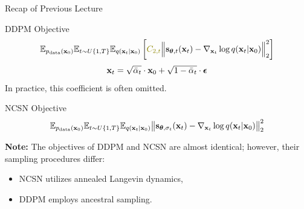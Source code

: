 \documentclass{beamer}
\begin{document}
\begin{frame}{Recap of Previous Lecture}
	\begin{block}{DDPM Objective}
		\vspace{-0.5cm}
		\[
			\bbE_{\pd(\bx_0)} \bbE_{t \sim U\{1, T\}}\bbE_{q(\bx_t | \bx_0)} \left[ {\color{olive}C_{2, t}} \Bigl\|  \bs_{\btheta, t} (\bx_t) - \nabla_{\bx_t} \log q(\bx_t | \bx_0) \Bigr\|_2^2  \right]
		\]
		\[
			\mathbf{x}_t = \sqrt{\bar{\alpha}_t} \cdot \mathbf{x}_0 + \sqrt{1 - \bar{\alpha}_t} \cdot \boldsymbol{\epsilon}
		\]
		In practice, {\color{olive}this coefficient} is often omitted.
	\end{block}
	\begin{block}{NCSN Objective}
		\vspace{-0.3cm}
		\[
			\mathbb{E}_{p_{\text{data}}(\mathbf{x}_0)} \mathbb{E}_{t \sim U\{1, T\}} \mathbb{E}_{q(\mathbf{x}_t | \mathbf{x}_0)}\bigl\| \mathbf{s}_{\boldsymbol{\theta}, \sigma_t}(\mathbf{x}_t) - \nabla_{\mathbf{x}_t} \log q(\mathbf{x}_t | \mathbf{x}_0) \bigr\|^2_2 
		\]
		\vspace{-0.3cm}
	\end{block}
	\textbf{Note:} The objectives of DDPM and NCSN are almost identical; however, their sampling procedures differ:
	\begin{itemize}
		\item NCSN utilizes annealed Langevin dynamics,
		\item DDPM employs ancestral sampling.
	\end{itemize}
\end{frame}
\end{document}
